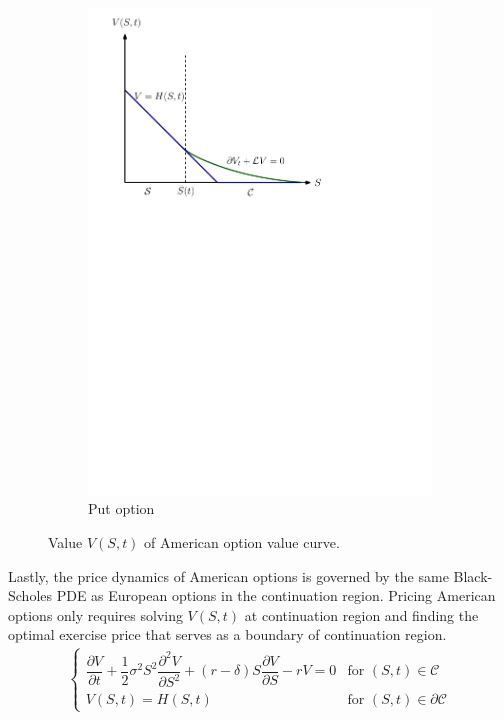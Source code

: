 \begin{figure}[H]
\begin{subfigure}{0.4\textwidth}
    \includegraphics[width=\textwidth]{chapters/chapter2/AmericanPutOptionValue.pdf}
    \caption{Put option}
    \label{fig:blackscholes:preliminaries:american_put_value_vs_curve}
  \end{subfigure}
  \caption{Value $V(S, t)$ of American option value curve. }
  \label{fig:blackscholes:preliminaries:american_option_value_vs_curve}
\end{figure}
Lastly, the price dynamics of
American options is governed by the same Black-Scholes PDE as European options in the continuation region. Pricing American options only requires solving $V(S,t)$ at continuation region and finding the optimal exercise price that serves as a boundary of continuation region. 
\begin{align}
  \begin{cases}
    \dfrac{\partial{V}}{\partial{t}} + \dfrac{1}{2}\sigma^{2} S^2 \dfrac{\partial^2{V}}{\partial{S^2}} + (r - \delta)S \dfrac{\partial{V}}{\partial{S}} - rV = 0 & \text{for $(S, t) \in \mathcal{C}$} \\ V(S, t) = H(S, t) &
    \text{for $(S,t)\in \partial\mathcal{C}$}
  \end{cases}
  \label{eq:blackscholes:preliminaries:american_options_pde_free_boundary_problem}
\end{align}
